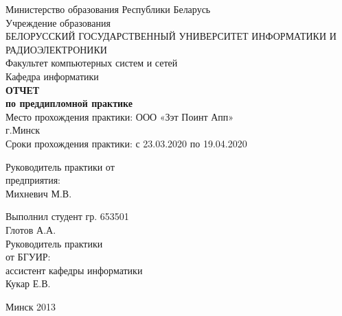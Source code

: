 \begin{titlepage}
    
    \begin{center}
        Министерство образования Республики Беларусь \\[0.4cm] 

        Учреждение образования \\

        \MakeUppercase{БЕЛОРУССКИЙ ГОСУДАРСТВЕННЫЙ УНИВЕРСИТЕТ ИНФОРМАТИКИ И РАДИОЭЛЕКТРОНИКИ} \\[0.4cm]

        Факультет компьютерных систем и сетей \\[0.4cm]

        Кафедра информатики \\[3.4cm] %

        {\large\bfseries{ОТЧЕТ}} \\[2cm]
        {\large\bfseries{по преддипломной практике}} \\[2cm]
        Место прохождения практики: ООО «Зэт Поинт Апп»\\
        г.Минск \\
        Сроки прохождения практики: с 23.03.2020 по 19.04.2020 \\

        \noindent
        \begin{minipage}{0.5\textwidth}
        	\begin{flushleft}
        		Руководитель практики от \\
        		предприятия: \\
        		Михневич М.В. \\[1cm]
        	\end{flushleft}
        \end{minipage}
    
	    \begin{minipage}{0.5\textwidth}
	    	\begin{flushright}
	    		Выполнил студент гр. 653501 \\
	    		Глотов А.А. \\[1cm]
	    		
	    		
	    		
	    		Руководитель практики \\
	    		от БГУИР: \\
	    		ассистент кафедры информатики \\
	    		Кукар Е.В. \\
	    	\end{flushright}
	    \end{minipage}

        \vfill

        {\normalsize Минск 2013}
    \end{center}

\end{titlepage}
